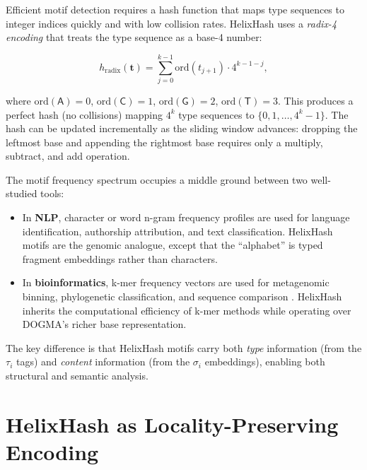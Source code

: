 Efficient motif detection requires a hash function that maps type sequences to integer indices quickly and with low collision rates. HelixHash uses a \emph{radix-4 encoding} that treats the type sequence as a base-4 number:

\begin{equation}
h_{\text{radix}}(\mathbf{t}) = \sum_{j=0}^{k-1} \mathrm{ord}(t_{j+1}) \cdot 4^{k-1-j},
\label{eq:radix-hash}
\end{equation}

where $\mathrm{ord}(\mathsf{A}) = 0$, $\mathrm{ord}(\mathsf{C}) = 1$, $\mathrm{ord}(\mathsf{G}) = 2$, $\mathrm{ord}(\mathsf{T}) = 3$. This produces a perfect hash (no collisions) mapping $4^k$ type sequences to $\{0, 1, \ldots, 4^k - 1\}$. The hash can be updated incrementally as the sliding window advances: dropping the leftmost base and appending the rightmost base requires only a multiply, subtract, and add operation.

\begin{implnote}
The motif frequency spectrum occupies a middle ground between two well-studied tools:
\begin{itemize}[leftmargin=1.5em]
  \item In \textbf{NLP}, character or word n-gram frequency profiles are used for language identification, authorship attribution, and text classification. HelixHash motifs are the genomic analogue, except that the ``alphabet'' is typed fragment embeddings rather than characters.
  \item In \textbf{bioinformatics}, k-mer frequency vectors are used for metagenomic binning, phylogenetic classification, and sequence comparison \citep{wood2014}. HelixHash inherits the computational efficiency of k-mer methods while operating over DOGMA's richer base representation.
\end{itemize}
The key difference is that HelixHash motifs carry both \emph{type} information (from the $\tau_i$ tags) and \emph{content} information (from the $\sigma_i$ embeddings), enabling both structural and semantic analysis.
\end{implnote}

\section{HelixHash as Locality-Preserving Encoding}
\label{sec:locality-preserving}

